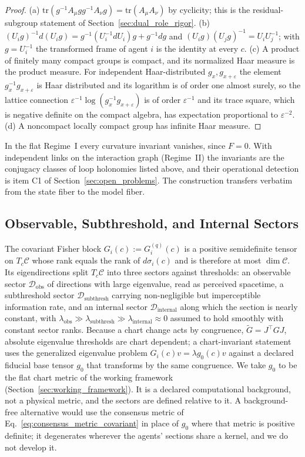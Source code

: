 \documentclass[11pt]{article}
\begin{document}
\begin{proof}
(a) $\mathrm{tr}(g^{-1}A_\mu g g^{-1}A_\nu g) = \mathrm{tr}(A_\mu A_\nu)$ by cyclicity; this is the residual-subgroup statement of Section~\ref{sec:dual_role_rigor}. (b) $(U_i g)^{-1} d(U_i g) = g^{-1}(U_i^{-1} dU_i) g + g^{-1} dg$ and $(U_i g)(U_j g)^{-1} = U_i U_j^{-1}$; with $g = U_i^{-1}$ the transformed frame of agent $i$ is the identity at every $c$. (c) A product of finitely many compact groups is compact, and its normalized Haar measure is the product measure. For independent Haar-distributed $g_x, g_{x+\varepsilon}$ the element $g_x^{-1}g_{x+\varepsilon}$ is Haar distributed and its logarithm is of order one almost surely, so the lattice connection $\varepsilon^{-1}\log(g_x^{-1}g_{x+\varepsilon})$ is of order $\varepsilon^{-1}$ and its trace square, which is negative definite on the compact algebra, has expectation proportional to $\varepsilon^{-2}$. (d) A noncompact locally compact group has infinite Haar measure.
\end{proof}
In the flat Regime~I every curvature invariant vanishes, since $F = 0$. With independent links on the interaction graph (Regime~II) the invariants are the conjugacy classes of loop holonomies listed above, and their operational detection is item C1 of Section~\ref{sec:open_problems}. The construction transfers verbatim from the state fiber to the model fiber.

\subsection{Observable, Subthreshold, and Internal Sectors}
\label{sec:observable_sectors}

The covariant Fisher block $G_i(c) := G^{(q)}_i(c)$ is a positive semidefinite tensor on $T_c\mathcal{C}$ whose rank equals the rank of $d\sigma_i(c)$ and is therefore at most $\dim\mathcal{C}$. Its eigendirections split $T_c\mathcal{C}$ into three sectors against thresholds: an observable sector $\mathcal{D}_{\text{obs}}$ of directions with large eigenvalue, read as perceived spacetime, a subthreshold sector $\mathcal{D}_{\text{subthresh}}$ carrying non-negligible but imperceptible information rate, and an internal sector $\mathcal{D}_{\text{internal}}$ along which the section is nearly constant, with $\lambda_{\text{obs}} \gg \lambda_{\text{subthresh}} \gg \lambda_{\text{internal}} \approx 0$ assumed to hold smoothly with constant sector ranks. Because a chart change acts by congruence, $\tilde{G} = J^\top G J$, absolute eigenvalue thresholds are chart dependent; a chart-invariant statement uses the generalized eigenvalue problem $G_i(c) v = \lambda g_0(c) v$ against a declared fiducial base tensor $g_0$ that transforms by the same congruence. We take $g_0$ to be the flat chart metric of the working framework (Section~\ref{sec:working_framework}). It is a declared computational background, not a physical metric, and the sectors are defined relative to it. A background-free alternative would use the consensus metric of Eq.~\eqref{eq:consensus_metric_covariant} in place of $g_0$ where that metric is positive definite; it degenerates wherever the agents' sections share a kernel, and we do not develop it.
\end{document}

